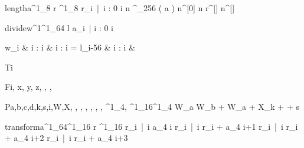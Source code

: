 \documentclass[12pt,a4paper]{book}
\begin{document}
\begin{eqcode}{length}{a}{}{^1_8}
    r \in {}^1_8 \lend
    r_i\  |\  i : 0 \leq i   \lend
     n ^{\lfloor \log_{256} \left ( a \right ) \rfloor } \lend
    n^{[0]} \gets n \lend
    r^{[\iter]} \gets {} \lend
    n^{[\iter]} \gets {} \lend
     \lend
\end{eqcode}

\begin{eqcode}{divide}{w}{^1}{^1_{64}}
    l \gets {} \lend
    a_i\   |  i : 0 \leq i \ \gets
        \begin{cases}
            w_i & i : i \leq {} \lend
              & i : i =  \lend
            l_{i-56} & i : i   & \otherwise \lend
        \end{cases} \lend
     \lend
\end{eqcode}

\begin{eqcode}{T}{i}{}{}
     \lend
\end{eqcode}

\begin{eqcode}{F}{i, x, y, z}{, , ,
}{}
        \lend
       \lend
       \lend
       \lend
    \qendif
\end{eqcode}

\begin{eqcode}{P}{a,b,c,d,k,s,i,W,X}{, , ,
, , , , ^1_4,
^1_{16}}{^1_4}
    W_a \gets W_b + {{W_a + X_k +   + } \ll s } \lend
     \lend
\end{eqcode}

\begin{eqcode}{transform}{a}{^1_{64}}{^1_{16}}
    r \in {}^1_{16} \lend
    r_i\  |\  \forall i \gets a_{4 \cdot i}  \lend
    r_i\  |\  \forall i \gets r_i + a_{4 \cdot i+1}  \lend
    r_i\  |\  \forall i \gets r_i + a_{4 \cdot i+2}  \lend
    r_i\  |\  \forall i  \gets r_i + a_{4 \cdot i+3} \lend
     \lend
\end{eqcode}
\end{document}
